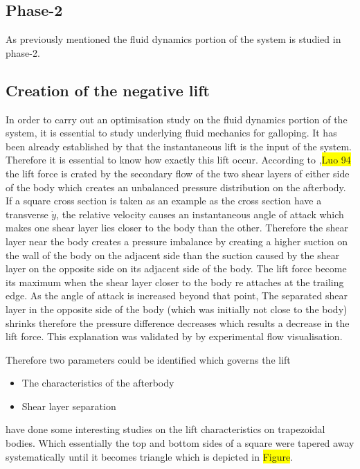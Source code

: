 \documentclass{article}
\newcommand{\hilight}[1]{\colorbox{yellow}{#1}}
\begin{document}
\subsection{Phase-2}

As previously mentioned the fluid dynamics portion of the system is studied in phase-2.

\subsection{Creation of the negative lift}

In order to carry out an optimisation study on the fluid dynamics portion of the system, it is essential to study underlying fluid mechanics for galloping. It has been already established by \cite{Parkinson1964} that the instantaneous lift is the input of the system. Therefore it is essential to know how exactly this lift occur. According to \cite{Parkinson1989},\hilight{Luo 94} the lift force is crated by the secondary flow of the two shear layers of either side of the body which creates an unbalanced pressure distribution on the afterbody. If a square cross section is taken as an example as the cross section have a transverse $\dot{y}$, the relative velocity causes an instantaneous angle of attack which makes one shear layer lies closer to the body than the other. Therefore the shear layer near the body creates a pressure imbalance by creating a higher suction on the wall of the body on the adjacent side than the suction caused by the shear layer on the opposite side on its adjacent side of the body. The lift force become its maximum when the shear layer closer to the body re attaches at the trailing edge. As the angle of attack is increased beyond that point, The separated shear layer in the opposite side of the body (which was initially not close to the body) shrinks therefore the pressure difference decreases which results a decrease in the lift force. This explanation was validated by \cite{Luo1994} by experimental flow visualisation.

Therefore two parameters could be identified which governs the lift 

\begin{itemize}
\item{ The characteristics of the afterbody}
\item{Shear layer separation}
\end{itemize}
 
\cite{Luo1994} have done some interesting studies on the lift characteristics on trapezoidal bodies. Which essentially the top and bottom sides of a square were tapered away systematically until it becomes triangle which is depicted in \hilight{Figure}.
\end{document}

